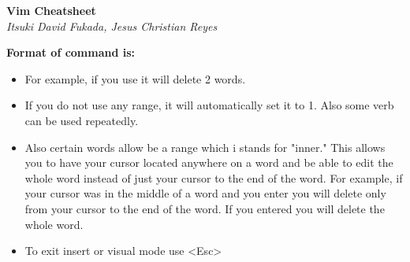 \documentclass{article}
\begin{document}
\begin{center}
\LARGE\textbf{Vim Cheatsheet}\\
\textit{Itsuki David Fukada, Jesus Christian Reyes}
\end{center}

\begin{framed}
\begin{center}
\Large\textbf{Format of command is: }
\end{center}
\begin{itemize}
\item For example, if you use  \normalfont{,} it will delete 2 words.\\
\item If you do not use any range, it will automatically set it to 1. Also some verb can be used repeatedly.\\
\item Also certain words allow   be a range which i stands for "inner." This allows you to have your
cursor located anywhere on a word and be able to edit the whole word instead of just your cursor to the
end of the word. For example, if your cursor was in the middle of a word and you enter \normalfont{,} you will
delete only from your cursor to the end of the word. If you entered \normalfont{,} you will delete the whole word.
\item To exit insert or visual mode use \textless Esc\textgreater \\
\end{itemize}
\end{framed}
\end{document}
